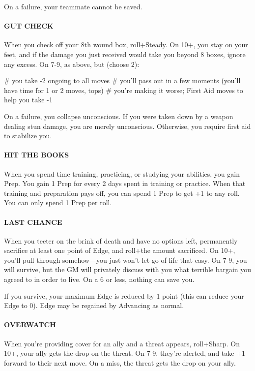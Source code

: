 On a failure, your teammate cannot be saved.


\paragraph{GUT CHECK}
When you check off your 8th wound box, roll+Steady. On 10+, you stay on your feet, and if the damage you just received would take you beyond 8 boxes, ignore any excess. On 7-9, as above, but (choose 2):

\begin{easylist}
# you take -2 ongoing to all moves
# you’ll pass out in a few moments (you’ll have time for 1 or 2 moves, tops)
# you’re making it worse; First Aid moves to help you take -1
\end{easylist}

On a failure, you collapse unconscious. If you were taken down by a weapon dealing stun damage, you are merely unconscious. Otherwise, you require first aid to stabilize you.


\paragraph{HIT THE BOOKS}
When you spend time training, practicing, or studying your abilities, you gain Prep. You gain 1 Prep for every 2 days spent in training or practice. When that training and preparation pays off, you can spend 1 Prep to get +1 to any roll. You can only spend 1 Prep per roll.


\paragraph{LAST CHANCE}
When you teeter on the brink of death and have no options left, permanently sacrifice at least one point of Edge, and roll+the amount sacrificed. On 10+, you’ll pull through somehow—you just won’t let go of life that easy. On 7-9, you will survive, but the GM will privately discuss with you what terrible bargain you agreed to in order to live. On a 6 or less, nothing can save you.

If you survive, your maximum Edge is reduced by 1 point (this can reduce your Edge to 0). Edge may be regained by Advancing as normal.


\paragraph{OVERWATCH}
When you’re providing cover for an ally and a threat appears, roll+Sharp. On 10+, your ally gets the drop on the threat. On 7-9, they’re alerted, and take +1 forward to their next move. On a miss, the threat gets the drop on your ally.


